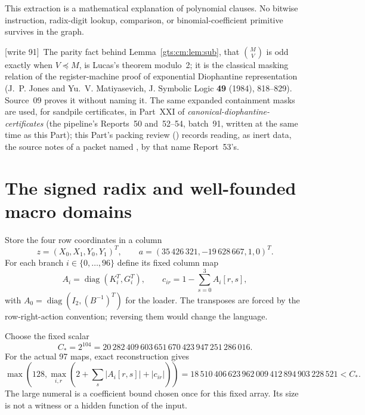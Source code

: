 \documentclass[11pt,letterpaper]{article}
\theoremstyle{definition}
\theoremstyle{remark}
\newcommand{\diag}{\operatorname{diag}}
\newcommand{\wtagd}{\textup{[write 91]}}
\begin{document}
This extraction is a mathematical explanation of polynomial clauses. No bitwise instruction, radix-digit lookup, comparison, or binomial-coefficient primitive survives in the graph.

\wtagd\ The parity fact behind Lemma~\ref{gts:cm:lem:sub}, that $\binom MV$ is odd exactly when $V\preceq M$, is Lucas's theorem modulo~2; it is the classical masking relation of the register-machine proof of exponential Diophantine representation (J.~P. Jones and Yu.~V. Matiyasevich, J. Symbolic Logic \textbf{49} (1984), 818--829). Source~09 proves it without naming it. The same expanded containment masks are used, for sandpile certificates, in Part~XXI of \emph{canonical-diophantine-certificates} (the pipeline's Reports~50 and~52--54, batch~91, written at the same time as this Part); this Part's packing review () records reading, as inert data, the source notes of a packet named , by that name Report~53's.

\section{The signed radix and well-founded macro domains}
\label{gts:cm:sec:radix}
Store the four row coordinates in a column
\[
 z=(X_0,X_1,Y_0,Y_1)^T,\qquad
 a=(35\,426\,321,-19\,628\,667,1,0)^T.
\]
For each branch $i\in\{0,\ldots,96\}$ define its fixed column map
\[
 A_i=\diag(K_i^T,G_i^T),\qquad
 c_{ir}=1-\sum_{s=0}^3 A_i[r,s],
\]
with $A_0=\diag(I_2,(B^{-1})^T)$ for the loader. The transposes are forced by the row-right-action convention; reversing them would change the language.

Choose the fixed scalar
\begin{equation}\label{gts:cm:eq:C}
 C_*=2^{104}=20\,282\,409\,603\,651\,670\,423\,947\,251\,286\,016.
\end{equation}
For the actual 97 maps, exact reconstruction gives
\begin{equation}\label{gts:cm:eq:threshold}
 \max\left(128,\max_{i,r}\left(2+\sum_s|A_i[r,s]|+|c_{ir}|\right)\right)
 =18\,510\,406\,623\,962\,009\,412\,894\,903\,228\,521<C_*.
\end{equation}
The large numeral is a coefficient bound chosen once for this fixed array. Its size is not a witness or a hidden function of the input.
\end{document}
